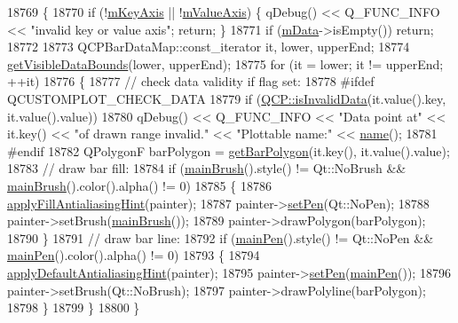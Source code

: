 \begin{DoxyCode}
18769 \{
18770   \textcolor{keywordflow}{if} (!\hyperlink{class_q_c_p_abstract_plottable_a426f42e254d0f8ce5436a868c61a6827}{mKeyAxis} || !\hyperlink{class_q_c_p_abstract_plottable_a2901452ca4aea911a1827717934a4bda}{mValueAxis}) \{ qDebug() << Q\_FUNC\_INFO << \textcolor{stringliteral}{"invalid key or value axis"};
       \textcolor{keywordflow}{return}; \}
18771   \textcolor{keywordflow}{if} (\hyperlink{class_q_c_p_bars_aef28d29d51ef84b608ecd22c55d531ff}{mData}->isEmpty()) \textcolor{keywordflow}{return};
18772   
18773   QCPBarDataMap::const\_iterator it, lower, upperEnd;
18774   \hyperlink{class_q_c_p_bars_af73d2032be0a64d2692bb76b08c79ec2}{getVisibleDataBounds}(lower, upperEnd);
18775   \textcolor{keywordflow}{for} (it = lower; it != upperEnd; ++it)
18776   \{
18777     \textcolor{comment}{// check data validity if flag set:}
18778 \textcolor{preprocessor}{#ifdef QCUSTOMPLOT\_CHECK\_DATA}
18779     \textcolor{keywordflow}{if} (\hyperlink{namespace_q_c_p_a07ab701c05329089f933b9cae2638a63}{QCP::isInvalidData}(it.value().key, it.value().value))
18780       qDebug() << Q\_FUNC\_INFO << \textcolor{stringliteral}{"Data point at"} << it.key() << \textcolor{stringliteral}{"of drawn range invalid."} << \textcolor{stringliteral}{"Plottable
       name:"} << \hyperlink{class_q_c_p_abstract_plottable_a1affc1972938e4364a9325e4e4e4dcea}{name}();
18781 \textcolor{preprocessor}{#endif}
18782     QPolygonF barPolygon = \hyperlink{class_q_c_p_bars_a1d118a76662cfd691a78c6f573e3f78c}{getBarPolygon}(it.key(), it.value().value);
18783     \textcolor{comment}{// draw bar fill:}
18784     \textcolor{keywordflow}{if} (\hyperlink{class_q_c_p_abstract_plottable_ae74c123832da180c17e22203e748d9b7}{mainBrush}().style() != Qt::NoBrush && \hyperlink{class_q_c_p_abstract_plottable_ae74c123832da180c17e22203e748d9b7}{mainBrush}().color().alpha() != 0)
18785     \{
18786       \hyperlink{class_q_c_p_abstract_plottable_ac08a480155895e674dbfe5a5670e0ff3}{applyFillAntialiasingHint}(painter);
18787       painter->\hyperlink{class_q_c_p_painter_af9c7a4cd1791403901f8c5b82a150195}{setPen}(Qt::NoPen);
18788       painter->setBrush(\hyperlink{class_q_c_p_abstract_plottable_ae74c123832da180c17e22203e748d9b7}{mainBrush}());
18789       painter->drawPolygon(barPolygon);
18790     \}
18791     \textcolor{comment}{// draw bar line:}
18792     \textcolor{keywordflow}{if} (\hyperlink{class_q_c_p_abstract_plottable_a19276ed2382a3a06464417b8788b1451}{mainPen}().style() != Qt::NoPen && \hyperlink{class_q_c_p_abstract_plottable_a19276ed2382a3a06464417b8788b1451}{mainPen}().color().alpha() != 0)
18793     \{
18794       \hyperlink{class_q_c_p_abstract_plottable_a76e9d6cc7972dc1528f526d163766aca}{applyDefaultAntialiasingHint}(painter);
18795       painter->\hyperlink{class_q_c_p_painter_af9c7a4cd1791403901f8c5b82a150195}{setPen}(\hyperlink{class_q_c_p_abstract_plottable_a19276ed2382a3a06464417b8788b1451}{mainPen}());
18796       painter->setBrush(Qt::NoBrush);
18797       painter->drawPolyline(barPolygon);
18798     \}
18799   \}
18800 \}
\end{DoxyCode}


